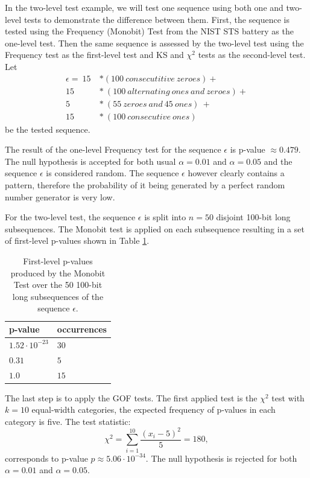 \documentclass[
  digital,     %
  oneside,     %
  nosansbold,  %
  nocolorbold, %
  nolof,         %
  nolot,         %
]{fithesis4}
\begin{document}
In the two-level test example, we will test one sequence using both one and two-level tests to demonstrate the difference between them. First, the sequence is tested using the Frequency (Monobit) Test \cite[p. 2-2]{nist_special} from the NIST STS battery as the one-level test. Then the same sequence is assessed by the two-level test using the Frequency test as the first-level test and KS and $\chi^2$ tests as the second-level test. Let
\[\begin{split}
    \epsilon =\:15\: &* (100\:consecutitive\:zeroes) + \\
    15\:&*\:(100\:alternating\:ones\:and\:zeroes) + \\
    5\:&*\:(55\:zeroes\:and\:45\:ones)\:+\:\\
    15\:&*\:(100\:consecutive\:ones)
\end{split}\]
be the tested sequence. 

The result of the one-level Frequency test for the sequence $\epsilon$ is p-value $\approx 0.479$. The null hypothesis is accepted for both usual $\alpha = 0.01$ and $\alpha = 0.05$ and the sequence $\epsilon$ is considered random. The sequence $\epsilon$ however clearly contains a pattern, therefore the probability of it being generated by a perfect random number generator is very low.

For the two-level test, the sequence $\epsilon$ is split into $n=50$ disjoint 100-bit long subsequences. The Monobit test is applied on each subsequence resulting in a set of first-level p-values shown in Table \ref{tab:first_pvalues}.

\begin{table}[h]
  \begin{tabularx}{0.4\textwidth}{ll}
    \toprule
    p-value & occurrences  \\
    \midrule
    $1.52 \cdot 10^{-23}$ & $30$\\
    $0.31$ & $5$\\
    $1.0$ & $15$\\
    \bottomrule
  \end{tabularx}
  \caption{First-level p-values produced by the Monobit Test over the 50 100-bit long subsequences of the sequence $\epsilon$.}
  \label{tab:first_pvalues}
\end{table}

The last step is to apply the GOF tests. The first applied test is the $\chi^2$ test with $k=10$ equal-width categories, the expected frequency of p-values in each category is five. The test statistic:
\[\chi^2 = \sum_{i=1}^{10} \dfrac{(x_i - 5)^2}{5} = 180,\]
corresponds to p-value $p\approx5.06\cdot10^{-34}$. The null hypothesis is rejected for both $\alpha = 0.01$ and $\alpha = 0.05$. 
\end{document}
